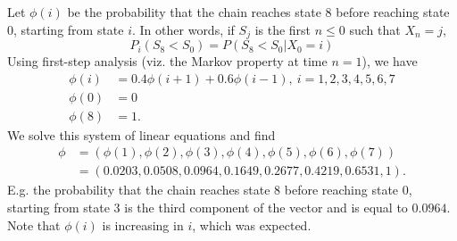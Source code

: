 \begin{enumerate}[label=\alph*)]
\begin{solution}[8cm]
Let $\phi(i)$ be the probability that the chain reaches state 8 before 
reaching state 0, starting from state $i$. In other words, if $S_j$ is 
the first $n \leq 0$ such that $X_n = j$, 
\begin{equation}
P_i(S_8 < S_0) = P(S_8 < S_0|X_0 = i)
\end{equation}
Using first-step analysis (viz. the Markov property at time $n = 1$), 
we have 
\begin{align*}
\phi(i) &= 0.4 \phi(i + 1) + 0.6 \phi(i - 1),\ i = 1, 2,3,4,5,6,7 \\
\phi(0) &= 0 \\
\phi(8) &= 1.
\end{align*}
We solve this system of linear equations and find
\begin{align*}
\phi &= (\phi(1), \phi(2), \phi(3), \phi(4), \phi(5), \phi(6), \phi(7)) \\
&= (0.0203, 0.0508, 0.0964, 0.1649, 0.2677, 0.4219, 0.6531, 1).
\end{align*}
E.g. the probability that the chain reaches state 8 before reaching 
state 0, starting from state 3 is the third component of the vector 
and is equal to $0.0964$. Note that $\phi(i)$ is increasing in $i$, 
which was expected.
\end{solution}


\end{enumerate}
